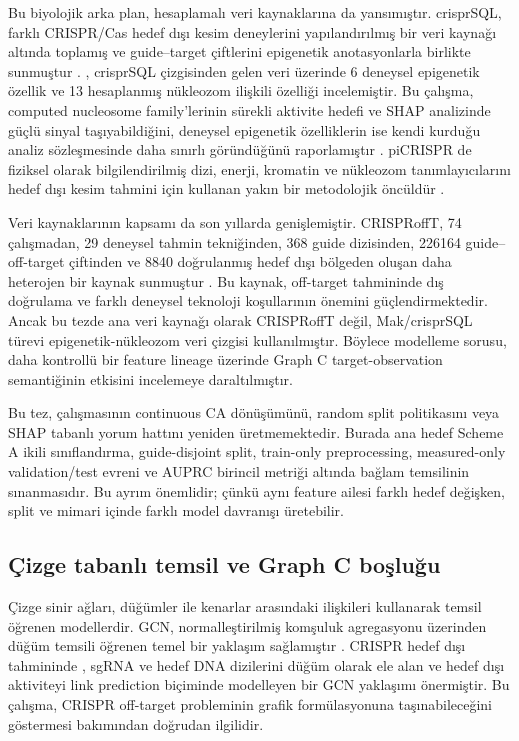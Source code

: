 Bu biyolojik arka plan, hesaplamalı veri kaynaklarına da yansımıştır. crisprSQL, farklı CRISPR/Cas hedef dışı kesim deneylerini yapılandırılmış bir veri kaynağı altında toplamış ve guide--target çiftlerini epigenetik anotasyonlarla birlikte sunmuştur . , crisprSQL çizgisinden gelen veri üzerinde 6 deneysel epigenetik özellik ve 13 hesaplanmış nükleozom ilişkili özelliği incelemiştir. Bu çalışma, computed nucleosome family'lerinin sürekli aktivite hedefi ve SHAP analizinde güçlü sinyal taşıyabildiğini, deneysel epigenetik özelliklerin ise kendi kurduğu analiz sözleşmesinde daha sınırlı göründüğünü raporlamıştır . piCRISPR de fiziksel olarak bilgilendirilmiş dizi, enerji, kromatin ve nükleozom tanımlayıcılarını hedef dışı kesim tahmini için kullanan yakın bir metodolojik öncüldür .

Veri kaynaklarının kapsamı da son yıllarda genişlemiştir. CRISPRoffT, 74 çalışmadan, 29 deneysel tahmin tekniğinden, 368 guide dizisinden, 226164 guide--off-target çiftinden ve 8840 doğrulanmış hedef dışı bölgeden oluşan daha heterojen bir kaynak sunmuştur . Bu kaynak, off-target tahmininde dış doğrulama ve farklı deneysel teknoloji koşullarının önemini güçlendirmektedir. Ancak bu tezde ana veri kaynağı olarak CRISPRoffT değil, Mak/crisprSQL türevi epigenetik-nükleozom veri çizgisi kullanılmıştır. Böylece modelleme sorusu, daha kontrollü bir feature lineage üzerinde Graph C target-observation semantiğinin etkisini incelemeye daraltılmıştır.

Bu tez,  çalışmasının continuous CA dönüşümünü, random split politikasını veya SHAP tabanlı yorum hattını yeniden üretmemektedir. Burada ana hedef Scheme A ikili sınıflandırma, guide-disjoint split, train-only preprocessing, measured-only validation/test evreni ve AUPRC birincil metriği altında bağlam temsilinin sınanmasıdır. Bu ayrım önemlidir; çünkü aynı feature ailesi farklı hedef değişken, split ve mimari içinde farklı model davranışı üretebilir.

\subsection{Çizge tabanlı temsil ve Graph C boşluğu}

Çizge sinir ağları, düğümler ile kenarlar arasındaki ilişkileri kullanarak temsil öğrenen modellerdir. GCN, normalleştirilmiş komşuluk agregasyonu üzerinden düğüm temsili öğrenen temel bir yaklaşım sağlamıştır . CRISPR hedef dışı tahmininde , sgRNA ve hedef DNA dizilerini düğüm olarak ele alan ve hedef dışı aktiviteyi link prediction biçiminde modelleyen bir GCN yaklaşımı önermiştir. Bu çalışma, CRISPR off-target probleminin grafik formülasyonuna taşınabileceğini göstermesi bakımından doğrudan ilgilidir.


